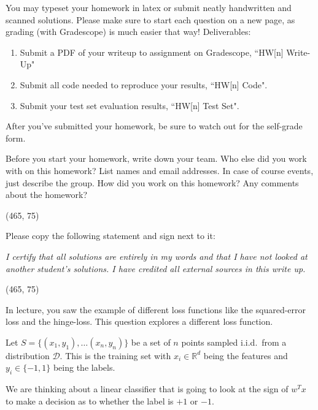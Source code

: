 
You may typeset your homework in latex or submit neatly handwritten and scanned solutions. Please make sure to start each question on a new page, as grading (with Gradescope) is much easier that way! Deliverables:

\begin{enumerate}
  \item Submit a PDF of your writeup to assignment on Gradescope, ``HW[n] Write-Up"
  \item Submit all code needed to reproduce your results, ``HW[n] Code".
  \item Submit your test set evaluation results, ``HW[n] Test Set".
\end{enumerate}

After you've submitted your homework, be sure to watch out for the self-grade form.

\begin{Parts}

\Part Before you start your homework, write down your team. Who else did you work with on this homework? List names and email addresses. In case of course events, just describe the group. How did you work on this homework? Any comments about the homework?

\vspace{15pt}
\framebox(465, 75){}

\Part Please copy the following statement and sign next to it:

\textit{I certify that all solutions are entirely in my words and that I have not looked at another student's solutions. I have credited all external sources in this write up.}

\vspace{15pt}
\framebox(465, 75){}

\end{Parts}

\pagebreak


In lecture, you saw the example of different loss functions like the
squared-error loss and the hinge-loss. This question explores a
different loss function. 

Let $S=\{(x_1,y_1), \ldots (x_n,y_n)\}$ be a set of $n$ points sampled
i.i.d.~from a distribution $\mathcal{D}$.  This is the training set
with $x_i \in \mathbb{R}^d$ being the features and $y_i \in \{-1,1\}$
being the labels.

We are thinking about a linear classifier that is going to look at the
sign of $w^T x$ to make a decision as to whether the label is $+1$ or
$-1$. 

